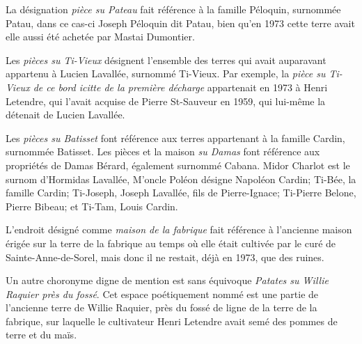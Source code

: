 \documentclass[12pt]{article}
\begin{document}
La désignation \emph{pièce su Pateau} fait référence à la famille Péloquin, surnommée Patau, dans ce cas-ci Joseph Péloquin dit Patau, bien qu'en 1973 cette terre avait elle aussi été achetée par Mastai Dumontier. 

Les \emph{pièces su Ti-Vieux} désignent l'ensemble des terres qui avait auparavant appartenu à Lucien Lavallée, surnommé Ti-Vieux. Par exemple, la \emph{pièce su Ti-Vieux de ce bord icitte de la première décharge} appartenait en 1973 à Henri Letendre, qui l'avait acquise de Pierre St-Sauveur en 1959, qui lui-même la détenait de Lucien Lavallée.

Les \emph{pièces su Batisset} font référence aux terres appartenant à la famille Cardin, surnommée Batisset. Les pièces et la maison \emph{su Damas} font référence aux propriétés de Damas Bérard, également surnommé Cabana. Midor Charlot est le surnom d’Hormidas Lavallée, M’oncle Poléon désigne Napoléon Cardin; Ti-Bée, la famille Cardin; Ti-Joseph, Joseph Lavallée, fils de Pierre-Ignace; Ti-Pierre Belone, Pierre Bibeau; et Ti-Tam, Louis Cardin.

L’endroit désigné comme \emph{maison de la fabrique} fait référence à l’ancienne maison érigée sur la terre de la fabrique au temps où elle était cultivée par le curé de Sainte-Anne-de-Sorel, mais donc il ne restait, déjà en 1973, que des ruines.

Un autre choronyme digne de mention est sans équivoque \emph{Patates su Willie Raquier près du fossé}. Cet espace poétiquement nommé est une partie de l’ancienne terre de Willie Raquier, près du fossé de ligne de la terre de la fabrique, sur laquelle le cultivateur Henri Letendre avait semé des pommes de terre et du maïs.

\printbibliography
\end{document}
